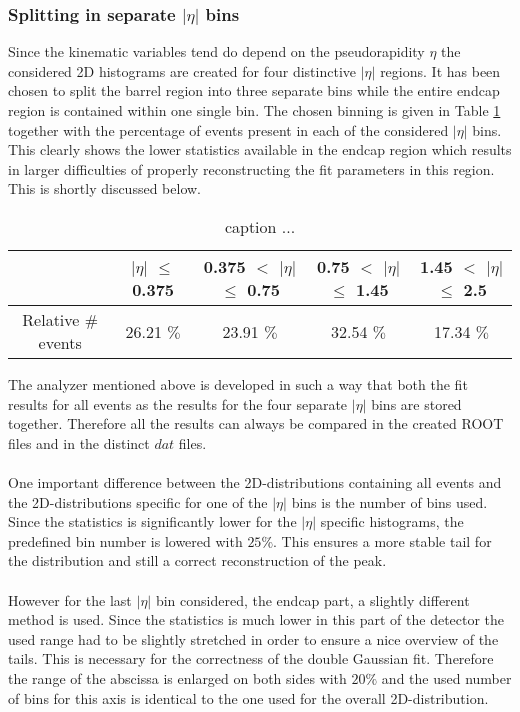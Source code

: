 \subsubsection{Splitting in separate $\vert \eta \vert$ bins}
Since the kinematic variables tend do depend on the pseudorapidity $\eta$ the considered 2D histograms are created for four distinctive $\vert \eta \vert$ regions. It has been chosen to split the barrel region into three separate bins while the entire endcap region is contained within one single bin. The chosen binning is given in Table \ref{table::EtaBins} together with the percentage of events present in each of the considered $\vert \eta \vert$ bins. This clearly shows the lower statistics available in the endcap region which results in larger difficulties of properly reconstructing the fit parameters in this region. This is shortly discussed below.
\begin{table}[h!]
 \centering
 \begin{tabular}{|c|c|c|c|c|}
  \hline
			 & $\vert\eta\vert$ $\leq$ 0.375	& 0.375 $<$ $\vert\eta\vert$ $\leq$ 0.75	& 0.75 $<$ $\vert\eta\vert$ $\leq$ 1.45	& 1.45 $<$ $\vert\eta\vert$ $\leq$ 2.5	\\
  \hline
    Relative $\#$ events &  26.21 $\%$				& 23.91 $\%$					&	32.54 $\%$			& 	17.34 $\%$			\\
  \hline
 \end{tabular} 
 \caption{caption ... } \label{table::EtaBins}
\end{table}

The analyzer mentioned above is developed in such a way that both the fit results for all events as the results for the four separate $\vert \eta \vert$ bins are stored together. Therefore all the results can always be compared in the created ROOT files and in the distinct $dat$ files.\\
\\
One important difference between the 2D-distributions containing all events and the 2D-distributions specific for one of the $\vert \eta \vert$ bins is the number of bins used. Since the statistics is significantly lower for the $\vert \eta \vert$ specific histograms, the predefined bin number is lowered with $25 \%$. This ensures a more stable tail for the distribution and still a correct reconstruction of the peak.\\
\\
However for the last $\vert \eta \vert$ bin considered, the endcap part, a slightly different method is used. Since the statistics is much lower in this part of the detector the used range had to be slightly stretched in order to ensure a nice overview of the tails. This is necessary for the correctness of the double Gaussian fit. Therefore the range of the abscissa is enlarged on both sides with $20 \%$ and the used number of bins for this axis is identical to the one used for the overall 2D-distribution. 


